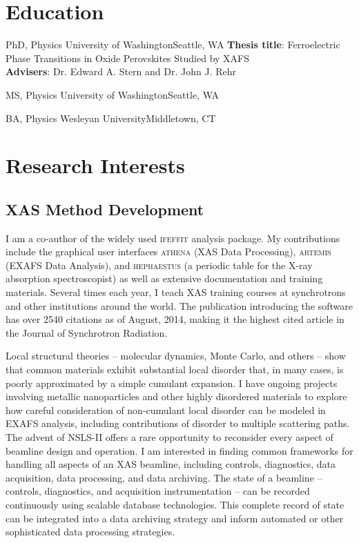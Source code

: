 \documentclass[11pt]{moderncv}
\begin{document}
\section{Education}
        {PhD, Physics}
        {University of Washington}{Seattle, WA}{}
        {\textbf{Thesis title}: Ferroelectric Phase Transitions in Oxide
          Perovskites Studied by XAFS\\
          \textbf{Advisers}: Dr. Edward A. Stern and Dr. John J. Rehr}  %

        {MS, Physics}
        {University of Washington}{Seattle, WA}{}{}

        {BA, Physics}
        {Wesleyan University}{Middletown, CT}{}{}


\section{Research Interests}

\subsection{XAS Method Development}
%
{I am a co-author of the widely used \textsc{ifeffit} analysis
  package.  My contributions include the graphical user interfaces
  \textsc{athena} (XAS Data Processing), \textsc{artemis} (EXAFS Data
  Analysis), and \textsc{hephaestus} (a periodic table for the X-ray
  absorption spectroscopist) as well as extensive documentation and
  training materials.  Several times each year, I teach XAS training
  courses at synchrotrons and other institutions around the
  world. \newline{} The publication introducing the software has over
  2540 citations as of August, 2014, making it the highest cited
  article in the Journal of Synchrotron Radiation.}

%
{Local structural theories -- molecular dynamics, Monte Carlo,
  and others -- show that common materials exhibit substantial local
  disorder that, in many cases, is poorly approximated by a simple
  cumulant expansion.  I have ongoing projects involving metallic
  nanoparticles and other highly disordered materials to explore how
  careful consideration of non-cumulant local disorder can be modeled
  in EXAFS analysis, including contributions of disorder to multiple
  scattering paths.}
%
%
{The advent of NSLS-II offers a rare opportunity to reconsider every
  aspect of beamline design and operation.  I am interested in finding
  common frameworks for handling all aspects of an XAS beamline,
  including controls, diagnostics, data acquisition, data processing,
  and data archiving.  The state of a beamline -- controls,
  diagnostics, and acquisition instrumentation -- can be recorded
  continuously using scalable database technologies.  This complete
  record of state can be integrated into a data archiving strategy and
  inform automated or other sophisticated data processing strategies.}
\end{document}
